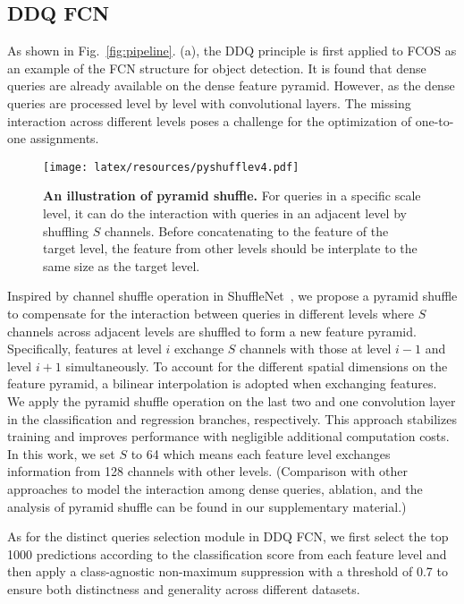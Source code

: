 \documentclass[10pt,twocolumn,letterpaper]{article}
\begin{document}
\subsection{DDQ FCN}   As shown in Fig.~\ref{fig:pipeline}. (a), the DDQ principle is first applied to FCOS as an example of the FCN structure for object detection. It is found that dense queries are already available on the dense feature pyramid. However, as the dense queries are processed level by level with convolutional layers. The missing interaction across different levels poses a challenge for the optimization of one-to-one assignments.

\begin{figure}[!h]
\centering
\texttt{[image: latex/resources/pyshufflev4.pdf]}
\vspace{-3mm}
\caption{\textbf{An illustration of pyramid shuffle.} For queries in a specific scale level,  it can do the interaction with queries in an adjacent level by shuffling $S$ channels. Before concatenating to the feature of the target level, the feature from other levels should be interplate to the same size as the target level.}
\label{fig:shuffle}
\vspace{-3mm}
\end{figure}

Inspired by channel shuffle operation in ShuffleNet~\cite{zhang2018shufflenet}, we propose a pyramid shuffle to compensate for the interaction between queries in different levels where $S$ channels across adjacent levels are shuffled to form a new feature pyramid. Specifically, features at level $i$ exchange $S$ channels with those at level $i-1$ and level $i+1$ simultaneously. To account for the different spatial dimensions on the feature pyramid, a bilinear interpolation is adopted when exchanging features. We apply the pyramid shuffle operation on the last two and one convolution layer in the classification and regression branches, respectively. This approach stabilizes training and improves performance with negligible additional computation costs. In this work, we set $S$ to 64 which means each feature level exchanges information from 128 channels with other levels. (Comparison with other approaches to model the interaction among dense queries, ablation, and the analysis of pyramid shuffle can be found in our supplementary material.) 

As for the distinct queries selection module in DDQ FCN, we first select the top 1000 predictions according to the classification score from each feature level and then apply a class-agnostic non-maximum suppression with a threshold of 0.7 to ensure both distinctness and generality across different datasets.
\end{document}
